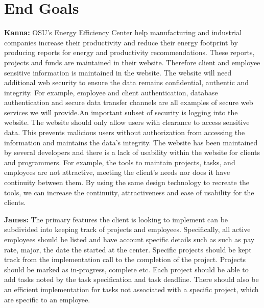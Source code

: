 \documentclass[letterpaper,10pt,titlepage,journal,compsoc,draftclsnofoot,onecolumn]{IEEEtran}
\newcommand\tab[1][1cm]{\hspace*{#1}}
\begin{document}
\section{End Goals}

\tab{We are building a secure, user friendly web application with good code practices for the Energy Efficiency Center. Stretch goals such as mobile web application or additional features will be added and evaluated based on the development process.}\newline\newline


{\textbf{Kanna:} \newline
\tab OSU’s Energy Efficiency Center help manufacturing and industrial companies increase their productivity and reduce their energy footprint by producing reports for energy and productivity recommendations. These reports, projects and funds are maintained in their website. Therefore client and employee sensitive information is maintained in the website. The website will need additional web security to ensure the data remains confidential, authentic and integrity. For example, employee and client authentication, database authentication and secure data transfer channels are all examples of secure web services we will provide.\newline\newline \tab An important subset of security is logging into the website. The website should only allow users  with clearance to access sensitive data. This prevents malicious users without authorization from accessing the information and maintains the data’s integrity. \newline\newline \tab The website has been maintained by several developers and there is a lack of usability within the website for clients and programmers. For example, the tools to maintain projects, tasks, and employees are not attractive, meeting the client's needs nor does it have continuity between them. By using the same design technology to recreate the tools, we can increase the continuity, attractiveness and ease of usability for the clients.\newline}


{\textbf{James:} \newline
\tab The primary features the client is looking to implement can be subdivided into keeping track of projects and employees. Specifically, all active employees should be listed and have account specific details such as such as pay rate, major, the date the started at the center. Specific projects should be kept track from the implementation call to the completion of the project. Projects should be marked as in-progress, complete etc. Each project should be able to add tasks noted by the task specification and task deadline. There should also be an efficient implementation for tasks not associated with a specific project, which are specific to an employee.\newline }
\end{document}
